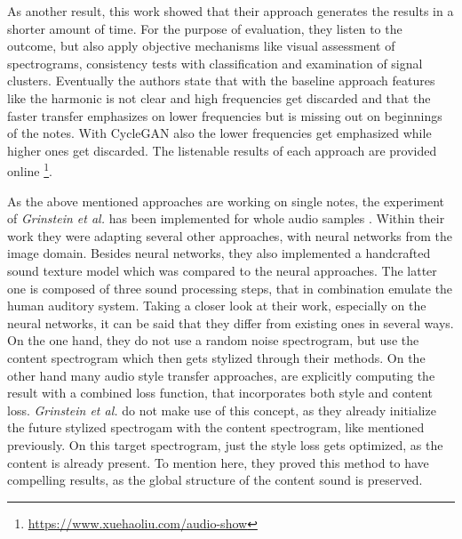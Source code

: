 As another result, this work showed that their approach generates the results in a shorter amount of time. For the purpose of evaluation, they listen to the outcome, but also apply objective mechanisms like visual assessment of spectrograms, consistency tests with classification and examination of signal clusters. Eventually the authors state that with the baseline approach features like the harmonic is not clear and high frequencies get discarded and that the faster transfer emphasizes on lower frequencies but is missing out on beginnings of the notes. With CycleGAN also the lower frequencies get emphasized while higher ones get discarded. The listenable results of each approach are provided online \footnote{\url{https://www.xuehaoliu.com/audio-show}}.

As the above mentioned approaches are working on single notes, the experiment of \textit{Grinstein et al.} has been implemented for whole audio samples \cite{Grinstein2018}. Within their work they were adapting several other approaches, with neural networks from the image domain. Besides neural networks, they also implemented a handcrafted sound texture model which was compared to the neural approaches. The latter one is composed of three sound processing steps, that in combination emulate the human auditory system. Taking a closer look at their work, especially on the neural networks, it can be said that they differ from existing ones in several ways. On the one hand, they do not use a random noise spectrogram, but use the content spectrogram which then gets stylized through their methods. On the other hand many audio style transfer approaches, are explicitly computing the result with a combined loss function, that incorporates both style and content loss. \textit{Grinstein et al.} do not make use of this concept, as they already initialize the future stylized spectrogam with the content spectrogram, like mentioned previously. On this target spectrogram, just the style loss gets optimized, as the content is already present. To mention here, they proved this method to have compelling results, as the global structure of the content sound is preserved.\\
